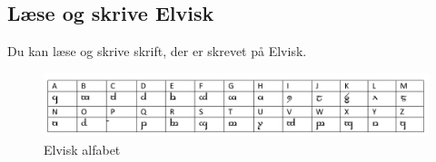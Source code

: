 \subsection*{Læse og skrive Elvisk}
Du kan læse og skrive skrift, der er skrevet på Elvisk.\\
\begin{figure}[H]
    \centering
    \includegraphics[width=1\textwidth]{setup/Alfabeter/Elvisk alfabet.pdf}
    \caption{Elvisk alfabet}
\end{figure}
